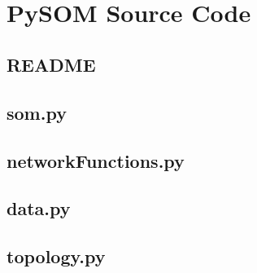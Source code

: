\appendices
%
%

\chapter{\\\vspace{12pt}PySOM Source Code}
\section{README}

\label{append:somcode}
\section{som.py}

\section{networkFunctions.py}

\section{data.py}

\section{topology.py}


